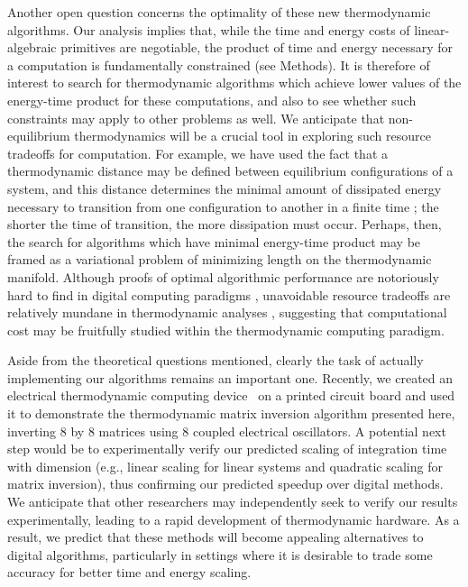 \documentclass[prx,onecolumn,floatfix,longbibliography,notitlepage, nofootinbib]{revtex4-1}
\begin{document}
Another open question concerns the optimality of these new thermodynamic algorithms. Our analysis implies that, while the time and energy costs of linear-algebraic primitives are negotiable, the product of time and energy necessary for a computation is fundamentally constrained (see Methods). It is therefore of interest to search for thermodynamic algorithms which achieve lower values of the energy-time product for these computations, and also to see whether such constraints may apply to other problems as well. We anticipate that non-equilibrium thermodynamics will be a crucial tool in exploring such resource tradeoffs for computation. For example, we have used the fact that a thermodynamic distance may be defined between equilibrium configurations of a system, and this distance determines the minimal amount of dissipated energy necessary to transition from one configuration to another in a finite time \cite{crooks2007measuring, cafaro2022thermodynamic, quevedo2007geometrothermodynamics,andresen1996finite,chen2021extrapolating}; the shorter the time of transition, the more dissipation must occur. Perhaps, then, the search for algorithms which have minimal energy-time product may be framed as a variational problem of minimizing length on the thermodynamic manifold. Although proofs of optimal algorithmic performance are notoriously hard to find in digital computing paradigms \cite{saptharishi2015survey}, unavoidable resource tradeoffs are  relatively mundane in thermodynamic analyses \cite{chiribella2022nonequilibrium, riechers2018transforming}, suggesting that computational cost may be fruitfully studied within the thermodynamic computing paradigm.


Aside from the theoretical questions mentioned, clearly the task of actually implementing our algorithms remains an important one. Recently, we created an electrical thermodynamic computing device~\cite{melanson2023thermodynamic} on a printed circuit board and used it to demonstrate the thermodynamic matrix inversion algorithm presented here, inverting 8 by 8 matrices using 8 coupled electrical oscillators. A potential next step would be to experimentally verify our predicted scaling of integration time with dimension (e.g., linear scaling for linear systems and quadratic scaling for matrix inversion), thus confirming our predicted speedup over digital methods. We anticipate that other researchers may independently seek to verify our results experimentally, leading to a rapid development of thermodynamic hardware. As a result, we predict that these methods will become appealing alternatives to digital algorithms, particularly in settings where it is desirable to trade some accuracy for better time and energy scaling.
\end{document}
